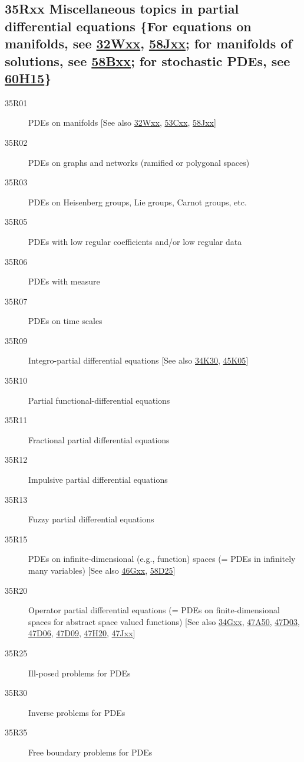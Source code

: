 \documentclass[letterpaper]{article}
\begin{document}
\subsection*{35Rxx  Miscellaneous topics in partial differential equations \{For equations on manifolds, see \hyperref[32Wxx]{32Wxx}, \hyperref[58Jxx]{58Jxx}; for manifolds of solutions, see \hyperref[58Bxx]{58Bxx}; for stochastic PDEs, see \hyperref[60H15]{60H15}\} }\label{35Rxx}
\begin{description}  
\item [35R01]\label{35R01} PDEs on manifolds [See also \hyperref[32Wxx]{32Wxx}, \hyperref[53Cxx]{53Cxx}, \hyperref[58Jxx]{58Jxx}]
\item [35R02]\label{35R02} PDEs on graphs and networks (ramified or polygonal spaces)
\item [35R03]\label{35R03} PDEs on Heisenberg groups, Lie groups, Carnot groups, etc.
\item [35R05]\label{35R05} PDEs with low regular coefficients and/or low regular data
\item [35R06]\label{35R06} PDEs with measure
\item [35R07]\label{35R07} PDEs on time scales
\item [35R09]\label{35R09} Integro-partial differential equations [See also \hyperref[34K30]{34K30}, \hyperref[45K05]{45K05}]
\item [35R10]\label{35R10} Partial functional-differential equations
\item [35R11]\label{35R11} Fractional partial differential equations
\item [35R12]\label{35R12} Impulsive partial differential equations
\item [35R13]\label{35R13} Fuzzy partial differential equations
\item [35R15]\label{35R15} PDEs on infinite-dimensional (e.g., function) spaces (= PDEs in infinitely many variables) [See also \hyperref[46Gxx]{46Gxx}, \hyperref[58D25]{58D25}]
\item [35R20]\label{35R20} Operator partial differential equations  (= PDEs on finite-dimensional spaces for abstract space valued functions) [See also \hyperref[34Gxx]{34Gxx}, \hyperref[47A50]{47A50}, \hyperref[47D03]{47D03}, \hyperref[47D06]{47D06}, \hyperref[47D09]{47D09}, \hyperref[47H20]{47H20}, \hyperref[47Jxx]{47Jxx}]
\item [35R25]\label{35R25} Ill-posed problems for PDEs
\item [35R30]\label{35R30} Inverse problems for PDEs
\item [35R35]\label{35R35} Free boundary problems for PDEs

\end{description}
\end{document}
